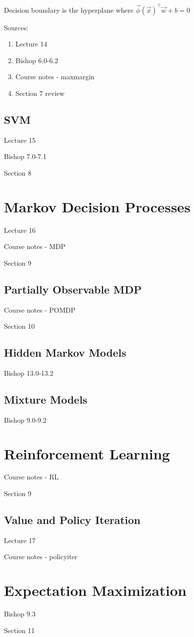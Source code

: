 \documentclass[11pt, oneside]{article}   	%
\begin{document}
Decision boundary is the hyperplane where $\vec{\phi}(\vec{x})^\intercal\vec{w}+b = 0$

Sources:
\begin{enumerate}
	\item Lecture 14
	\item Bishop 6.0-6.2 
	\item Course notes - maxmargin
	\item Section 7 review
\end{enumerate}


\subsection{SVM}
Lecture 15

Bishop 7.0-7.1

Section 8

\section{Markov Decision Processes}
Lecture 16

Course notes - MDP

Section 9

\subsection{Partially Observable MDP}
Course notes - POMDP

Section 10

\subsection{Hidden Markov Models}
Bishop 13.0-13.2

\subsection{Mixture Models}
Bishop 9.0-9.2

\section{Reinforcement Learning}
Course notes - RL

Section 9

\subsection{Value and Policy Iteration}
Lecture 17

Course notes - policyiter

\section{Expectation Maximization}

Bishop 9.3

Section 11
\end{document}

